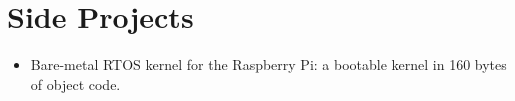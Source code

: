 \section*{Side Projects}
\vspace{-2mm}

\begin{itemize}
    \item Bare-metal RTOS kernel for the Raspberry Pi: a bootable kernel
        in 160 bytes of object code.
    \end{itemize}

